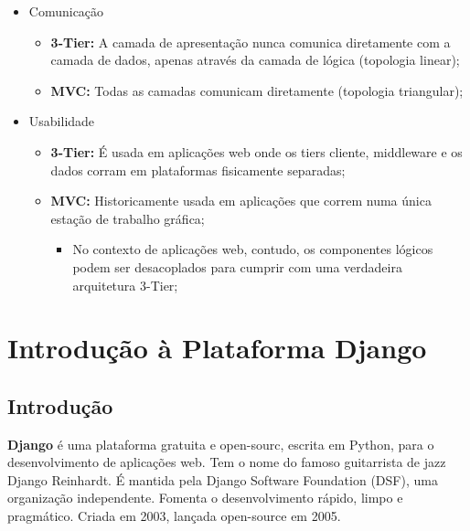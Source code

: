 \documentclass{article}
\begin{document}
\begin{flushleft}
  \begin{itemize}
    \item Comunicação
    \begin{itemize}
      \item \textbf{3-Tier:} A camada de apresentação nunca comunica diretamente
      com a camada de dados, apenas através da camada de lógica (topologia linear);
      \item \textbf{MVC:} Todas as camadas comunicam diretamente (topologia triangular);
    \end{itemize}

    \item Usabilidade
    \begin{itemize}
      \item \textbf{3-Tier:} É usada em aplicações web onde os tiers cliente, middleware
      e os dados corram em plataformas fisicamente separadas;
      \item \textbf{MVC:} Historicamente usada em aplicações que correm numa única estação de trabalho gráfica;
      \begin{itemize}
        \item No contexto de aplicações web, contudo, os componentes lógicos podem ser
        desacoplados para cumprir com uma verdadeira arquitetura 3-Tier;
      \end{itemize}
    \end{itemize}
  \end{itemize}
\end{flushleft}

\section{Introdução à Plataforma Django}

\subsection{Introdução}

\begin{flushleft}
  \textbf{Django} é uma plataforma gratuita e open-sourc, escrita em Python,
  para o desenvolvimento de aplicações web.
  Tem o nome do famoso guitarrista de jazz Django Reinhardt.
  É mantida pela Django Software Foundation (DSF), uma organização independente.
  Fomenta o desenvolvimento rápido, limpo e pragmático.
  Criada em 2003, lançada open-source em 2005.
\end{flushleft}
\end{document}
